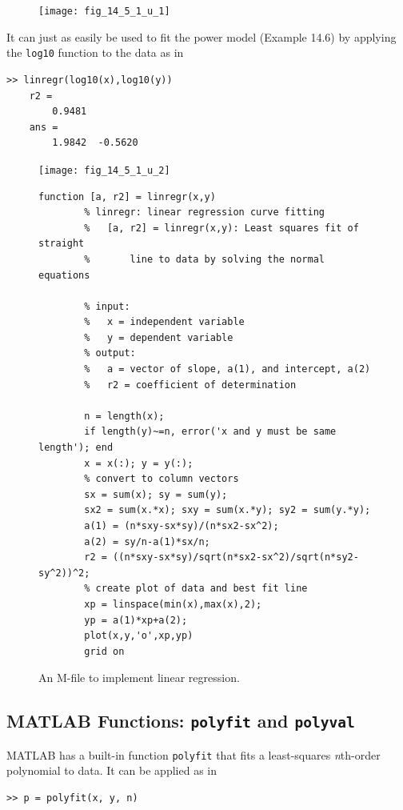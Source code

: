 \documentclass[../main.tex]{subfiles}
\begin{document}
\begin{figure}[H]
	\centering
	\texttt{[image: fig\_14\_5\_1\_u\_1]}
\end{figure}

It can just as easily be used to fit the power model (Example 14.6) by applying the
\texttt{log10} function to the data as in

\begin{lstlisting}[numbers=none]
	>> linregr(log10(x),log10(y))
	r2 =
		0.9481
	ans =
		1.9842	-0.5620
\end{lstlisting}

\begin{figure}[H]
	\centering
	\texttt{[image: fig\_14\_5\_1\_u\_2]}
\end{figure}

\begin{figure}[H]
	\centering
	\begin{lstlisting}[numbers=none]
		function [a, r2] = linregr(x,y)
		% linregr: linear regression curve fitting
		%	[a, r2] = linregr(x,y): Least squares fit of straight
		%		line to data by solving the normal equations

		% input:
		%	x = independent variable
		%	y = dependent variable
		% output:
		%	a = vector of slope, a(1), and intercept, a(2)
		%	r2 = coefficient of determination

		n = length(x);
		if length(y)~=n, error('x and y must be same length'); end
		x = x(:); y = y(:);
		% convert to column vectors
		sx = sum(x); sy = sum(y);
		sx2 = sum(x.*x); sxy = sum(x.*y); sy2 = sum(y.*y);
		a(1) = (n*sxy-sx*sy)/(n*sx2-sx^2);
		a(2) = sy/n-a(1)*sx/n;
		r2 = ((n*sxy-sx*sy)/sqrt(n*sx2-sx^2)/sqrt(n*sy2-sy^2))^2;
		% create plot of data and best fit line
		xp = linspace(min(x),max(x),2);
		yp = a(1)*xp+a(2);
		plot(x,y,'o',xp,yp)
		grid on
	\end{lstlisting}
	\caption{\textsf{An M-file to implement linear regression.}}
	\label{fig:fig_14_15}
\end{figure}

\label{cha:cha_P_14_5_2} %
\subsection{MATLAB Functions: \texttt{polyfit} and \texttt{polyval}}

\noindent MATLAB has a built-in function \texttt{polyfit} that fits a least-squares \textit{n}th-order polynomial to data. It can be applied as in

\begin{lstlisting}[numbers=none]
>> p = polyfit(x, y, n)
\end{lstlisting}
\end{document}
